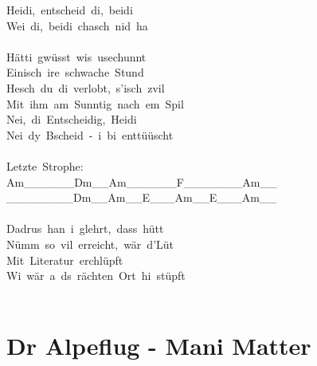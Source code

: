 \documentclass[]{book}
\let\stdsection\section
\renewcommand\section{\clearpage\stdsection}
\begin{document}
Heidi,~entscheid~di,~beidi\\
Wei~di,~beidi~chasch~nid~ha\\
~\\
Hätti~gwüsst~wis~usechunnt\\
Einisch~ire~schwache~Stund\\
Hesch~du~di~verlobt,~s'isch~zvil\\
Mit~ihm~am~Sunntig~nach~em~Spil\\
Nei,~di~Entscheidig,~Heidi\\
Nei~dy~Bscheid~-~i~bi~enttüüscht\\
~\\
Letzte~Strophe:\\
\textbar Am\_\_\_\_\_\_\textbar Dm\_\_Am\_\_\textbar\_\_\_\_F\_\_\_\textbar\_\_\_\_Am\_\_\textbar{}\\
\textbar\_\_\_\_\_\_\_\_\textbar Dm\_\_Am\_\_\textbar E\_\_\_Am\_\_\textbar E\_\_\_Am\_\_\textbar{}\\
~\\
Dadrus~han~i~glehrt,~dass~hütt\\
Nümm~so~vil~erreicht,~wär~d'Lüt\\
Mit~Literatur~erchlüpft\\
Wi~wär~a~ds~rächten~Ort~hi~stüpft\\
~\\

\hypertarget{dr-alpeflug---mani-matter}{%
\section{Dr Alpeflug - Mani Matter}\label{dr-alpeflug---mani-matter}}
\end{document}
